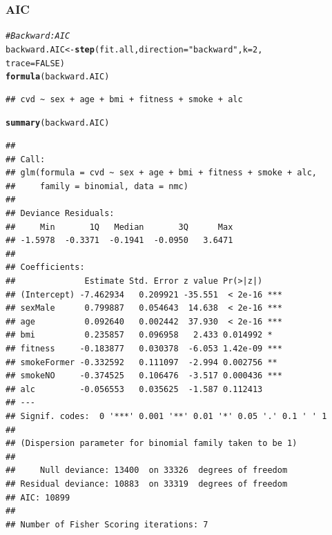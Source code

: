 \documentclass{article}\usepackage[]{graphicx}\usepackage[]{xcolor}
\makeatletter
\newcommand{\hlnum}[1]{\textcolor[rgb]{0.686,0.059,0.569}{#1}}%
\newcommand{\hlstr}[1]{\textcolor[rgb]{0.192,0.494,0.8}{#1}}%
\newcommand{\hlcom}[1]{\textcolor[rgb]{0.678,0.584,0.686}{\textit{#1}}}%
\newcommand{\hlstd}[1]{\textcolor[rgb]{0.345,0.345,0.345}{#1}}%
\newcommand{\hlkwb}[1]{\textcolor[rgb]{0.69,0.353,0.396}{#1}}%
\newcommand{\hlkwc}[1]{\textcolor[rgb]{0.333,0.667,0.333}{#1}}%
\newcommand{\hlkwd}[1]{\textcolor[rgb]{0.737,0.353,0.396}{\textbf{#1}}}%
\newenvironment{kframe}{%
 \def\at@end@of@kframe{}%
 \ifinner\ifhmode%
  \def\at@end@of@kframe{\end{minipage}}%
  \begin{minipage}{\columnwidth}%
 \fi\fi%
 \def\FrameCommand##1{\hskip\@totalleftmargin \hskip-\fboxsep
 \colorbox{shadecolor}{##1}\hskip-\fboxsep
     \hskip-\linewidth \hskip-\@totalleftmargin \hskip\columnwidth}%
 \MakeFramed {\advance\hsize-\width
   \@totalleftmargin\z@ \linewidth\hsize
   \@setminipage}}%
 {\par\unskip\endMakeFramed%
 \at@end@of@kframe}
\newenvironment{knitrout}{}{} %
\makeatother
\begin{document}
      \subsubsection{AIC}
\begin{knitrout}
\color{fgcolor}\begin{kframe}
\begin{alltt}
\hlcom{#Backward: AIC}
\hlstd{backward.AIC} \hlkwb{<-} \hlkwd{step}\hlstd{(fit.all,} \hlkwc{direction}\hlstd{=}\hlstr{"backward"}\hlstd{,} \hlkwc{k}\hlstd{=}\hlnum{2}\hlstd{,}
                     \hlkwc{trace}\hlstd{=}\hlnum{FALSE}\hlstd{)}
\hlkwd{formula}\hlstd{(backward.AIC)}
\end{alltt}
\begin{verbatim}
## cvd ~ sex + age + bmi + fitness + smoke + alc
\end{verbatim}
\begin{alltt}
\hlkwd{summary}\hlstd{(backward.AIC)}
\end{alltt}
\begin{verbatim}
## 
## Call:
## glm(formula = cvd ~ sex + age + bmi + fitness + smoke + alc, 
##     family = binomial, data = nmc)
## 
## Deviance Residuals: 
##     Min       1Q   Median       3Q      Max  
## -1.5978  -0.3371  -0.1941  -0.0950   3.6471  
## 
## Coefficients:
##              Estimate Std. Error z value Pr(>|z|)    
## (Intercept) -7.462934   0.209921 -35.551  < 2e-16 ***
## sexMale      0.799887   0.054643  14.638  < 2e-16 ***
## age          0.092640   0.002442  37.930  < 2e-16 ***
## bmi          0.235857   0.096958   2.433 0.014992 *  
## fitness     -0.183877   0.030378  -6.053 1.42e-09 ***
## smokeFormer -0.332592   0.111097  -2.994 0.002756 ** 
## smokeNO     -0.374525   0.106476  -3.517 0.000436 ***
## alc         -0.056553   0.035625  -1.587 0.112413    
## ---
## Signif. codes:  0 '***' 0.001 '**' 0.01 '*' 0.05 '.' 0.1 ' ' 1
## 
## (Dispersion parameter for binomial family taken to be 1)
## 
##     Null deviance: 13400  on 33326  degrees of freedom
## Residual deviance: 10883  on 33319  degrees of freedom
## AIC: 10899
## 
## Number of Fisher Scoring iterations: 7
\end{verbatim}
\end{kframe}
\end{knitrout}
        
\end{document}
